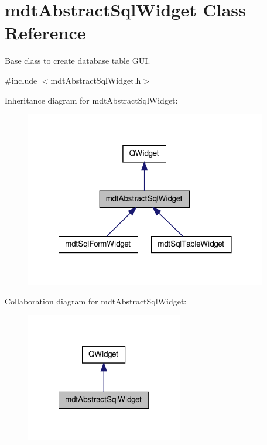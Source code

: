 \hypertarget{classmdt_abstract_sql_widget}{\section{mdt\-Abstract\-Sql\-Widget Class Reference}
\label{classmdt_abstract_sql_widget}
}


Base class to create database table G\-U\-I.  




{\ttfamily \#include $<$mdt\-Abstract\-Sql\-Widget.\-h$>$}



Inheritance diagram for mdt\-Abstract\-Sql\-Widget\-:\nopagebreak
\begin{figure}[H]
\begin{center}
\leavevmode
\includegraphics[width=300pt]{classmdt_abstract_sql_widget__inherit__graph}
\end{center}
\end{figure}


Collaboration diagram for mdt\-Abstract\-Sql\-Widget\-:\nopagebreak
\begin{figure}[H]
\begin{center}
\leavevmode
\includegraphics[width=194pt]{classmdt_abstract_sql_widget__coll__graph}
\end{center}
\end{figure}
